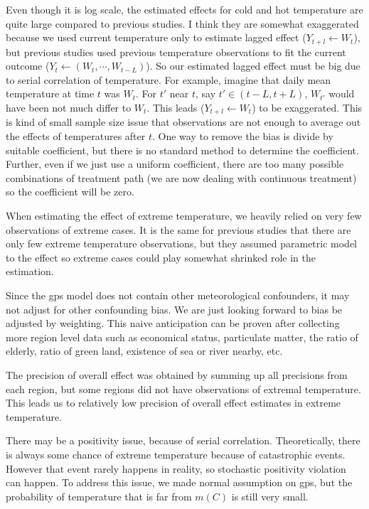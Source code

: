 \documentclass[12pt]{article}
\begin{document}
Even though it is log scale, 
the estimated effects for cold and hot temperature are quite large compared to previous studies.
I think they are somewhat exaggerated
because we used current temperature only to estimate lagged effect ($Y_{t+l} \leftarrow W_t$),
but previous studies used previous temperature observations 
to fit the current outcome ($Y_t \leftarrow (W_t, \cdots, W_{t-L})$).
So our estimated lagged effect must be big due to serial correlation of temperature.
For example, imagine that daily mean temperature at time $t$ was $W_t$.
For $t'$ near $t$, say $t' \in (t-L, t+L)$, $W_{t'}$ would have been not much differ to $W_t$.
This leads ($Y_{t+l} \leftarrow W_t$) to be exaggerated.
This is kind of small sample size issue that observations are not enough
to average out the effects of temperatures after $t$.
One way to remove the bias is divide by suitable coefficient\cite{bojinov2019},
but there is no standard method to determine the coefficient.
Further, even if we just use a uniform coefficient,
there are too many possible combinations of treatment path (we are now dealing with continuous treatment)
so the coefficient will be zero.


When estimating the effect of extreme temperature,
we heavily relied on very few observations of extreme cases.
It is the same for previous studies that there are only few extreme temperature observations,
but they assumed parametric model to the effect
so extreme cases could play somewhat shrinked role in the estimation.

Since the gps model does not contain other meteorological confounders,
it may not adjust for other confounding bias.
We are just looking forward to bias be adjusted by weighting.
This naive anticipation can be proven after collecting more region level data
such as economical status, particulate matter, the ratio of elderly, 
ratio of green land, existence of sea or river nearby, etc.

The precision of overall effect was obtained by summing up all precisions from each region,
but some regions did not have observations of extremal temperature.
This leads us to relatively low precision of overall effect estimates in extreme temperature.

There may be a positivity issue, because of serial correlation.
Theoretically, there is always some chance of extreme temperature because of catastrophic events.
However that event rarely happens in reality, 
so stochastic positivity violation\cite{zivich2022} can happen.
To address this issue, we made normal assumption on gps,
but the probability of temperature that is far from $m(C)$ is still very small.
\end{document}
